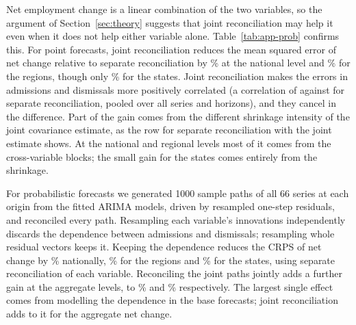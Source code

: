 Net employment change is a linear combination of the two variables, so the argument of Section~\ref{sec:theory} suggests that joint reconciliation may help it even when it does not help either variable alone. Table~\ref{tab:app-prob} confirms this. For point forecasts, joint reconciliation reduces the mean squared error of net change relative to separate reconciliation by \appNetPointTotal\% at the national level and \appNetPointRegions\% for the regions, though only \appNetPointStates\% for the states. Joint reconciliation makes the errors in admissions and dismissals more positively correlated (a correlation of \appErrCorJoint{} against \appErrCorSep{} for separate reconciliation, pooled over all series and horizons), and they cancel in the difference. Part of the gain comes from the different shrinkage intensity of the joint covariance estimate, as the row for separate reconciliation with the joint estimate shows. At the national and regional levels most of it comes from the cross-variable blocks; the small gain for the states comes entirely from the shrinkage.

For probabilistic forecasts we generated 1000 sample paths of all 66 series at each origin from the fitted ARIMA models, driven by resampled one-step residuals, and reconciled every path. Resampling each variable's innovations independently discards the dependence between admissions and dismissals; resampling whole residual vectors keeps it. Keeping the dependence reduces the CRPS of net change by \appNetJointSepTotal\% nationally, \appNetJointSepRegions\% for the regions and \appNetJointSepStates\% for the states, using separate reconciliation of each variable. Reconciling the joint paths jointly adds a further gain at the aggregate levels, to \appNetJointJointTotal\% and \appNetJointJointRegions\% respectively. The largest single effect comes from modelling the dependence in the base forecasts; joint reconciliation adds to it for the aggregate net change.


